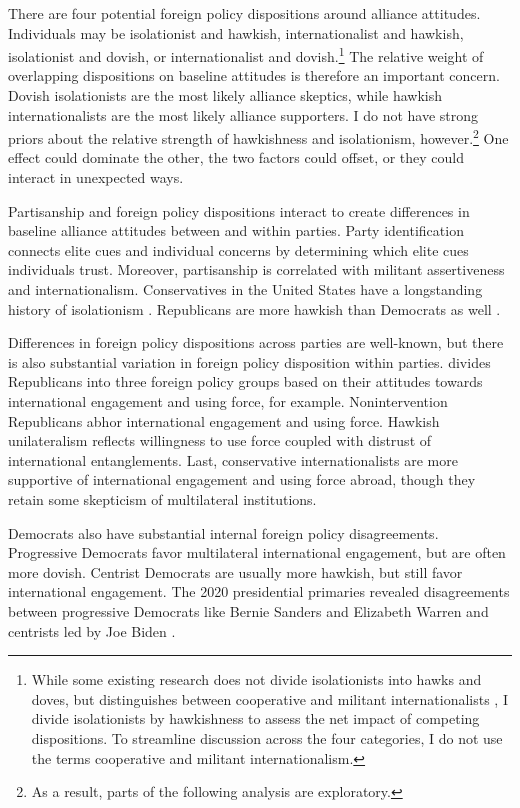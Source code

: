 \documentclass[12pt]{article}
\begin{document}
There are four potential foreign policy dispositions around alliance attitudes.
Individuals may be isolationist and hawkish, internationalist and hawkish, isolationist and dovish, or internationalist and dovish.\footnote{While some existing research does not divide isolationists into hawks and doves, but distinguishes between cooperative and militant internationalists \citep{Kertzeretal2014}, I divide isolationists by hawkishness to assess the net impact of competing dispositions. To streamline discussion across the four categories, I do not use the terms cooperative and militant internationalism.}
The relative weight of overlapping dispositions on baseline attitudes is therefore an important concern. 
Dovish isolationists are the most likely alliance skeptics, while hawkish internationalists are the most likely alliance supporters. 
I do not have strong priors about the relative strength of hawkishness and isolationism, however.\footnote{As a result, parts of the following analysis are exploratory.}
One effect could dominate the other, the two factors could offset, or they could interact in unexpected ways.


Partisanship and foreign policy dispositions interact to create differences in baseline alliance attitudes between and within parties. 
Party identification connects elite cues and individual concerns by determining which elite cues individuals trust.
Moreover, partisanship is correlated with militant assertiveness and internationalism. 
Conservatives in the United States have a longstanding history of isolationism \citep{Kupchan2020}.
Republicans are more hawkish than Democrats as well \citep{Gries2014}. 


Differences in foreign policy dispositions across parties are well-known, but there is also substantial variation in foreign policy disposition within parties.
\citet{Dueck2019} divides Republicans into three foreign policy groups based on their attitudes towards international engagement and using force, for example.
Nonintervention Republicans abhor international engagement and using force.
Hawkish unilateralism reflects willingness to use force coupled with distrust of international entanglements. 
Last, conservative internationalists are more supportive of international engagement and using force abroad, though they retain some skepticism of multilateral institutions.


Democrats also have substantial internal foreign policy disagreements. 
Progressive Democrats favor multilateral international engagement, but are often more dovish.
Centrist Democrats are usually more hawkish, but still favor international engagement. 
The 2020 presidential primaries revealed disagreements between progressive Democrats like Bernie Sanders and Elizabeth Warren and centrists led by Joe Biden \citep{Robinson2019demfp}. 
\end{document}
